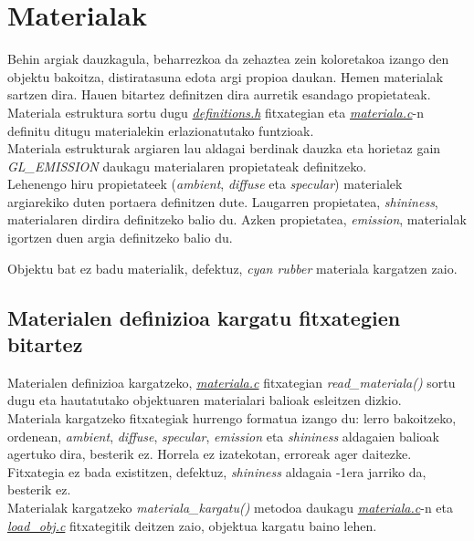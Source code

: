 \documentclass[12pt]{article}
\newcommand{\fitxategi}[1] {\underline{\textit{#1}}}
\newcommand{\metodo}[1] {\textit{#1}}
\newcommand{\aldagai}[1] {\textit{#1}}
\begin{document}
\section{Materialak}

Behin argiak dauzkagula, beharrezkoa da zehaztea zein koloretakoa izango den objektu bakoitza, distiratasuna edota argi propioa daukan. Hemen materialak sartzen dira. Hauen bitartez definitzen dira aurretik esandago propietateak.\\

Materiala estruktura sortu dugu \fitxategi{definitions.h} fitxategian eta \fitxategi{materiala.c}-n definitu ditugu materialekin erlazionatutako funtzioak.\\

Materiala estrukturak argiaren lau aldagai berdinak dauzka eta horietaz gain \aldagai{GL\_EMISSION} daukagu materialaren propietateak definitzeko.\\

Lehenengo hiru propietateek (\aldagai{ambient}, \aldagai{diffuse} eta \aldagai{specular}) materialek argiarekiko duten portaera definitzen dute. Laugarren propietatea, \aldagai{shininess}, materialaren dirdira definitzeko balio du. Azken propietatea, \aldagai{emission}, materialak igortzen duen argia definitzeko balio du.

Objektu bat ez badu materialik, defektuz, \aldagai{cyan rubber} materiala kargatzen zaio.\\

\subsection{Materialen definizioa kargatu fitxategien bitartez}

Materialen definizioa kargatzeko, \fitxategi{materiala.c} fitxategian \metodo{read\_materiala()} sortu dugu eta hautatutako objektuaren materialari balioak esleitzen dizkio.\\

Materiala kargatzeko fitxategiak hurrengo formatua izango du: lerro bakoitzeko, ordenean, \aldagai{ambient}, \aldagai{diffuse}, \aldagai{specular}, \aldagai{emission} eta \aldagai{shininess} aldagaien balioak agertuko dira, besterik ez. Horrela ez izatekotan, erroreak ager daitezke. Fitxategia ez bada existitzen, defektuz, \aldagai{shininess} aldagaia -1era jarriko da, besterik ez.\\

Materialak kargatzeko \metodo{materiala\_kargatu()} metodoa daukagu \fitxategi{materiala.c}-n eta \fitxategi{load\_obj.c} fitxategitik deitzen zaio, objektua kargatu baino lehen.
\end{document}
